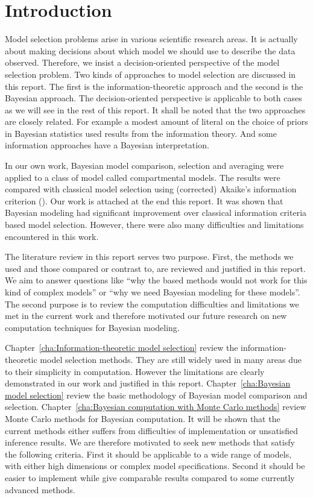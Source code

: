 \chapter{Introduction}
\label{cha:Introduction}

Model selection problems arise in various scientific research areas. It is
actually about making decisions about which model we should use to describe
the data observed. Therefore, we insist a decision-oriented perspective of the
model selection problem. Two kinds of approaches to model selection are
discussed in this report. The first is the information-theoretic approach and
the second is the Bayesian approach. The decision-oriented perspective is
applicable to both cases as we will see in the rest of this report. It shall
be noted that the two approaches are closely related. For example a modest
amount of literal on the choice of priors in Bayesian statistics used results
from the information theory. And some information approaches have a Bayesian
interpretation.

In our own work, Bayesian model comparison, selection and averaging were
applied to a class of model called compartmental models. The results were
compared with classical model selection using (corrected) Akaike's information
criterion (\aicc). Our work is attached at the end this report. It was shown
that Bayesian modeling had significant improvement over classical information
criteria based model selection. However, there were also many difficulties and
limitations encountered in this work.

The literature review in this report serves two purpose. First, the methods we
used and those compared or contrast to, are reviewed and justified in this
report. We aim to answer questions like ``why the \aic based methods would not
work for this kind of complex models'' or ``why we need Bayesian modeling for
these models''. The second purpose is to review the computation difficulties
and limitations we met in the current work and therefore motivated our future
research on new computation techniques for Bayesian modeling.

Chapter~\ref{cha:Information-theoretic model selection} review the
information-theoretic model selection methods. They are still widely used in
many areas due to their simplicity in computation. However the limitations are
clearly demonstrated in our work and justified in this report.
Chapter~\ref{cha:Bayesian model selection} review the basic methodology of
Bayesian model comparison and selection. Chapter~\ref{cha:Bayesian computation
  with Monte Carlo methods} review Monte Carlo methods for Bayesian
computation. It will be shown that the current methods either suffers from
difficulties of implementation or unsatisfied inference results. We are
therefore motivated to seek new methods that satisfy the following criteria.
First it should be applicable to a wide range of models, with either high
dimensions or complex model specifications. Second it should be easier to
implement while give comparable results compared to some currently advanced
methods.

